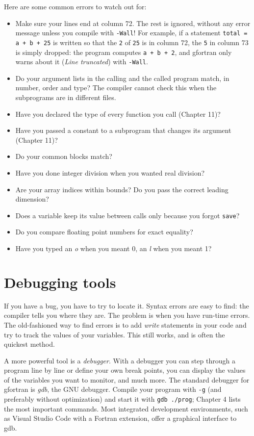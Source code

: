 Here are some common errors to watch out for:

\begin{itemize}
    \item Make sure your lines end at column 72. The rest is ignored, without any error message unless you compile with \texttt{-Wall}! For example, if a statement \texttt{total = a + b + 25} is written so that the \texttt{2} of \texttt{25} is in column 72, the \texttt{5} in column 73 is simply dropped: the program computes \texttt{a + b + 2}, and gfortran only warns about it (\emph{Line truncated}) with \texttt{-Wall}.
    \item Do your argument lists in the calling and the called program match, in number, order and type? The compiler cannot check this when the subprograms are in different files.
    \item Have you declared the type of every function you call (Chapter 11)?
    \item Have you passed a constant to a subprogram that changes its argument (Chapter 11)?
    \item Do your common blocks match?
    \item Have you done integer division when you wanted real division?
    \item Are your array indices within bounds? Do you pass the correct leading dimension?
    \item Does a variable keep its value between calls only because you forgot \texttt{save}?
    \item Do you compare floating point numbers for exact equality?
    \item Have you typed an \emph{o} when you meant 0, an \emph{l} when you meant 1?
\end{itemize}

\section{Debugging tools}

If you have a bug, you have to try to locate it. Syntax errors are easy to find: the compiler tells you where they are. The problem is when you have run-time errors. The old-fashioned way to find errors is to add \emph{write} statements in your code and try to track the values of your variables. This still works, and is often the quickest method.

A more powerful tool is a \emph{debugger}. With a debugger you can step through a program line by line or define your own break points, you can display the values of the variables you want to monitor, and much more. The standard debugger for gfortran is \emph{gdb}, the GNU debugger. Compile your program with \texttt{-g} (and preferably without optimization) and start it with \texttt{gdb ./prog}; Chapter 4 lists the most important commands. Most integrated development environments, such as Visual Studio Code with a Fortran extension, offer a graphical interface to gdb.

